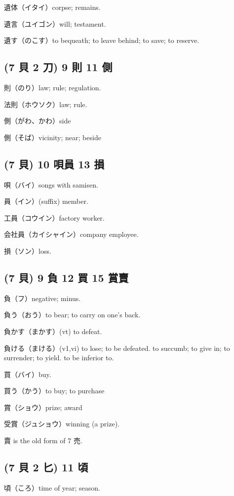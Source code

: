 遺体（イタイ）corpse; remains.

遺言（ユイゴン）will; testament.

遺す（のこす）to bequeath; to leave behind; to save; to reserve.

\subsection{(7 貝 2 刀) 9 則 11 側}

則（のり）law; rule; regulation.

法則（ホウソク）law; rule.

側（がわ、かわ）side

側（そば）vicinity; near; beside

\subsection{(7 貝) 10 唄員 13 損}

唄（バイ）songs with samisen.

員（イン）(suffix) member.

工員（コウイン）factory worker.

会社員（カイシャイン）company employee.

損（ソン）loss.

\subsection{(7 貝) 9 負 12 買 15 賞賣}

負（フ）negative; minus.

負う（おう）to bear; to carry on one's back.

負かす（まかす）(vt) to defeat.

負ける（まける）(v1,vi)
to lose; to be defeated.
to succumb; to give in; to surrender; to yield.
to be inferior to.

買（バイ）buy.

買う（かう）to buy; to purchase

賞（ショウ）prize; award

受賞（ジュショウ）winning (a prize).

賣 is the old form of 7 売.

\subsection{(7 貝 2 匕) 11 頃}

頃（ころ）time of year; season.

